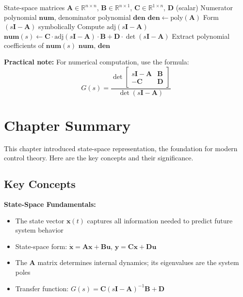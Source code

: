 \begin{algorithm}[H]
\caption{State-Space to Transfer Function (SISO)}
\label{alg:ss_to_tf}
\begin{algorithmic}[1]
\REQUIRE State-space matrices $\mathbf{A} \in \mathbb{R}^{n \times n}$, $\mathbf{B} \in \mathbb{R}^{n \times 1}$, $\mathbf{C} \in \mathbb{R}^{1 \times n}$, $\mathbf{D}$ (scalar)
\ENSURE Numerator polynomial $\mathbf{num}$, denominator polynomial $\mathbf{den}$
\STATE
{}
\STATE $\mathbf{den} \gets \text{poly}(\mathbf{A})$ 
\STATE
{}
\STATE Form $(s\mathbf{I} - \mathbf{A})$ symbolically
\STATE Compute $\text{adj}(s\mathbf{I} - \mathbf{A})$ 
\STATE $\mathbf{num}(s) \gets \mathbf{C} \cdot \text{adj}(s\mathbf{I} - \mathbf{A}) \cdot \mathbf{B} + \mathbf{D} \cdot \det(s\mathbf{I} - \mathbf{A})$
\STATE Extract polynomial coefficients of $\mathbf{num}(s)$
\STATE
\RETURN $\mathbf{num}$, $\mathbf{den}$
\end{algorithmic}
\end{algorithm}

\textbf{Practical note:} For numerical computation, use the formula:
\begin{equation}
G(s) = \frac{\det\begin{bmatrix} s\mathbf{I} - \mathbf{A} & \mathbf{B} \\ -\mathbf{C} & \mathbf{D} \end{bmatrix}}{\det(s\mathbf{I} - \mathbf{A})}
\end{equation}

\section{Chapter Summary}
\label{sec:chapter_summary}

This chapter introduced state-space representation, the foundation for modern control theory. Here are the key concepts and their significance.

\subsection{Key Concepts}

\textbf{State-Space Fundamentals:}
\begin{itemize}
    \item The state vector $\mathbf{x}(t)$ captures all information needed to predict future system behavior
    \item State-space form: $\dot{\mathbf{x}} = \mathbf{A}\mathbf{x} + \mathbf{B}\mathbf{u}$, $\mathbf{y} = \mathbf{C}\mathbf{x} + \mathbf{D}\mathbf{u}$
    \item The $\mathbf{A}$ matrix determines internal dynamics; its eigenvalues are the system poles
    \item Transfer function: $G(s) = \mathbf{C}(s\mathbf{I} - \mathbf{A})^{-1}\mathbf{B} + \mathbf{D}$
\end{itemize}

